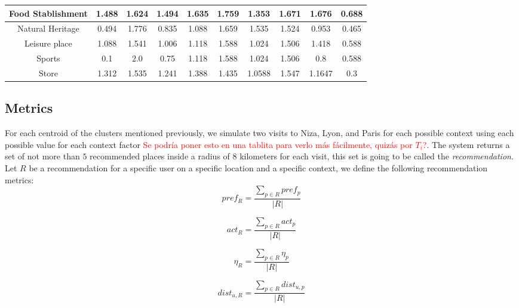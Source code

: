 \begin{table}[h!]
\begin{tabular}{ |c|c|c|c|c|c|c|c|c|c| }
    Food Stablishment &
    1.488  & 1.624 & 1.494  & 1.635  & 1.759 & 1.353 & 1.671 & 1.676  & 0.688  \\ \hline
    
    Natural Heritage &
    0.494  & 1.776 & 0.835  & 1.088  & 1.659 & 1.535  & 1.524 & 0.953 & 0.465 \\ \hline
    
    Leisure place &
    1.088  & 1.541  & 1.006 & 1.118 & 1.588  & 1.024 & 1.506 & 1.418 & 0.588  \\ \hline
    
    Sports &
    0.1 & 2.0 & 0.75 & 1.118 & 1.588  & 1.024 & 1.506 & 0.8 & 0.588  \\ \hline
    
    Store &
    1.312 & 1.535  & 1.241  & 1.388  & 1.435  &1.0588  & 1.547  & 1.1647  & 0.3 \\ \hline


\end{tabular}
\end{table}

\subsection{Metrics} \label{section:metrics}
For each centroid of the clusters mentioned previously, we simulate two visits to Niza, Lyon, and Paris for each possible context using each possible value for each context factor \textcolor{red}{Se podría poner esto en una tablita para verlo más fácilmente, quizás por $T_i$?}. The system returns a set of not more than $5$ recommended places inside a radius of $8$ kilometers for each visit, this set is going to be called the \textit{recommendation}. Let $R$ be a recommendation for a specific user on a specific location and a specific context, we define the following recommendation metrics:
\begin{equation}
    pref_{R} = \frac{ \displaystyle \sum_{p \in R}{pref_p} }{| R |}
\end{equation}

\begin{equation}
    act_{R} = \frac{ \displaystyle \sum_{p \in R}{act_p} }{| R |}
\end{equation}

\begin{equation}
    \eta_{R} = \frac{ \displaystyle \sum_{p \in R}{\eta_p} }{| R |}
\end{equation}

\begin{equation}
    dist_{u, R} = \frac{ \displaystyle \sum_{p \in R}{dist_{u, p}} }{| R |}
\end{equation}


